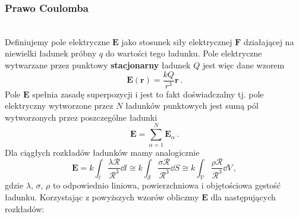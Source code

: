 \documentclass[../main.tex]{subfiles}
\begin{document}
\subsubsection{Prawo Coulomba}
\noindent{}\\

Definiujemy pole elektryczne \(\mathbf{E}\) jako stosunek siły elektrycznej \(\mathbf{F}\)
działającej na niewielki ładunek próbny \(q\) do wartości tego ładunku. Pole elektryczne wytwarzane
przez punktowy \textbf{stacjonarny} ładunek \(Q\) jest więc dane wzorem
\begin{equation*}
    \mathbf{E}(\mathbf{r})=\frac{kQ}{r^3}\mathbf{r}\,.
\end{equation*}
Pole \(\mathbf{E}\) spełnia zasadę superpozycji i jest to fakt doświadczalny tj. pole elektryczny
wytworzone przez \(N\) ładunków punktowych jest sumą pól wytworzonych przez poszczególne ładunki
\begin{equation*}
    \mathbf{E}=\sum_{\alpha=1}^N\mathbf{E}_\alpha \,.
\end{equation*}
Dla ciągłych rozkładów ładunków mamy analogicznie
\begin{equation*}
    \mathbf{E}=k\int_\ell \frac{\lambda \boldsymbol{\mathcal{R}}}{\mathcal{R}^3}\dd{l}\cong k\int_\mathcal{S} \frac{\sigma \boldsymbol{{\mathcal{R}}}}{\mathcal{R}^3}\dd{S}\cong k\int_\mathcal{V} \frac{\rho \boldsymbol{{\mathcal{R}}}}{\mathcal{R}^3}\dd{V}\,,
\end{equation*}
gdzie \(\lambda\), \(\sigma\), \(\rho\) to odpowiednio liniowa, powierzchniowa i objętościowa
gęstość ładunku. Korzystając z powyższych wzorów obliczmy \(\mathbf{E}\) dla następujących
rozkładów:
\end{document}
